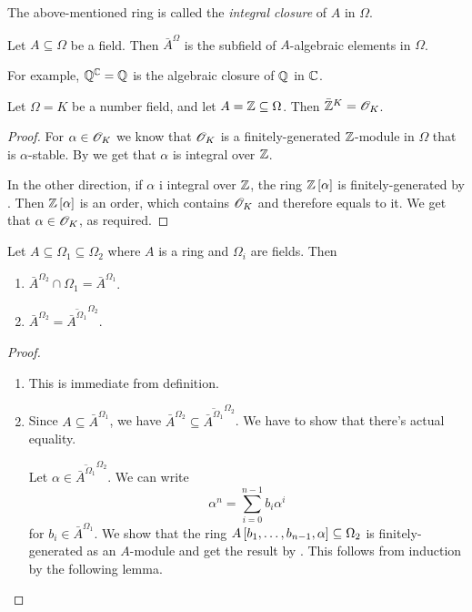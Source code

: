 \documentclass[11pt]{article}
\begin{document}
\begin{definition}
The above-mentioned ring is called the \emph{integral closure} of $A$ in $\Omega$.
\end{definition}

\begin{example}
Let $A \subseteq \Omega$ be a field. Then $\bar{A}^{\Omega}$ is the subfield of $A$-algebraic elements in $\Omega$.

For example, $\mathbb{Q}^{\mathbb{C}} = \mathbb{Q}$ is the algebraic closure of $\mathbb{Q}$ in $\mathbb{C}$.
\end{example}

\begin{proposition}
Let $\Omega = K$ be a number field, and let $A = \mathbb{Z} \subseteq \Omega$.
Then $\bar{\mathbb{Z}}^K = \mathcal{O}_K$. 
\end{proposition}

\begin{proof}
For $\alpha \in \mathcal{O}_K$ we know that $\mathcal{O}_K$ is a finitely-generated $\mathbb{Z}$-module in $\Omega$ that is $\alpha$-stable. By  we get that $\alpha$ is integral over $\mathbb{Z}$.

In the other direction, if $\alpha$ i integral over $\mathbb{Z}$, the ring $\mathbb{Z}\left[ \alpha \right]$ is finitely-generated by . Then $\mathbb{Z}\left[ \alpha \right]$ is an order, which contains $\mathcal{O}_K$ and therefore equals to it. We get that $\alpha \in \mathcal{O}_K$, as required.
\end{proof}

\begin{lemma}
Let $A \subseteq \Omega_1 \subseteq \Omega_2$ where $A$ is a ring and $\Omega_i$ are fields. Then
\begin{enumerate}
\item $\bar{A}^{\Omega_2} \cap \Omega_1 = \bar{A}^{\Omega_1}$.
\item $\bar{A}^{\Omega_2} = \overline{\bar{A}^{\Omega_1}}^{\Omega_2}$.
\end{enumerate}
\end{lemma}

\begin{proof}
\begin{enumerate}
\item%
This is immediate from definition.
\item%
Since $A \subseteq \bar{A}^{\Omega_1}$, we have $\bar{A}^{\Omega_2} \subseteq \overline{\bar{A}^{\Omega_1}}^{\Omega_2}$. We have to show that there's actual equality.

Let $\alpha \in \overline{\bar{A}^{\Omega_1}}^{\Omega_2}$. We can write
\[\alpha^n = \sum_{i = 0}^{n-1} b_i \alpha^i\]
for $b_i \in \bar{A}^{\Omega_1}$.
We show that the ring $A\left[ b_1, \ldots, b_{n-1}, \alpha \right] \subseteq \Omega_2$ is finitely-generated as an $A$-module and get the result by . 
This follows from induction by the following lemma.
\end{enumerate}
\end{proof}
\end{document}
